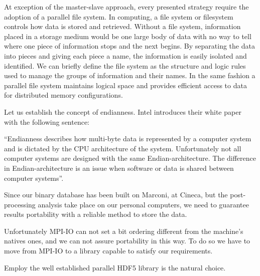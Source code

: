 At exception of the master-slave approach, every presented strategy require the adoption of a parallel file system.
In computing, a file system or filesystem controls how data is stored and retrieved. Without a file system, information placed in a storage medium would be one large body of data with no way to tell where one piece of information stops and the next begins. By separating the data into pieces and giving each piece a name, the information is easily isolated and identified. We can briefly define the file system as the structure and logic rules used to manage the groups of information and their names.
In the same fashion a parallel file system maintains logical space and provides efficient access to data for distributed memory configurations.\\
\par
Let us establish the concept of endianness.
Intel introduces their white paper with the following sentence:\par
``Endianness describes how multi-byte data is represented by a computer system and is dictated by the CPU architecture of the system. Unfortunately not all computer systems are designed with the same Endian-architecture. The difference in Endian-architecture is an issue when software or data is shared between computer systems''\cite{endianness}.\par
Since our binary database has been built on Marconi, at Cineca, but the post-processing analysis take place on our personal computers, we need to guarantee results portability with a reliable method to store the data. \\
\par
Unfortunately MPI-IO can not set a bit ordering different from the machine's natives ones, and we can not assure portability in this way. To do so we have to move from MPI-IO to a library capable to satisfy our requirements.\par
Employ the well established parallel HDF5 library is the natural choice.



